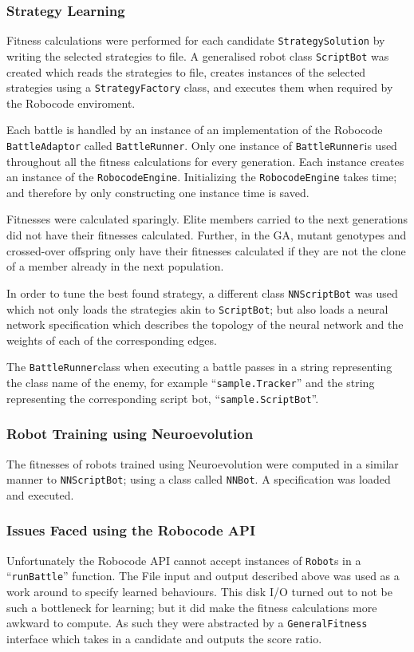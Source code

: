 \subsubsection{Strategy Learning}

Fitness calculations were performed for each candidate \texttt{StrategySolution} by writing the selected strategies to file. A generalised robot class \texttt{ScriptBot} was created which reads the strategies to file, creates instances of the selected strategies using a \texttt{StrategyFactory} class, and executes them when required by the Robocode enviroment.

\newcommand{\BattleRunner}{\texttt{BattleRunner}}

Each battle is handled by an instance of an implementation of the Robocode \\ \texttt{BattleAdaptor} called \BattleRunner. Only one instance of \BattleRunner is used throughout all the fitness calculations for every generation. Each instance creates an instance of the \texttt{RobocodeEngine}. Initializing the \texttt{RobocodeEngine} takes time; and therefore by only constructing one instance time is saved.

Fitnesses were calculated sparingly. Elite members carried to the next generations did not have their fitnesses calculated. Further, in the GA, mutant genotypes and crossed-over offspring only have their fitnesses calculated if they are not the clone of a member already in the next population.

In order to tune the best found strategy, a different class \texttt{NNScriptBot} was used which not only loads the strategies akin to \texttt{ScriptBot}; but also loads a neural network specification which describes the topology of the neural network and the weights of each of the corresponding edges.

The \BattleRunner class when executing a battle passes in a string representing the class name of the enemy, for example ``\texttt{sample.Tracker}'' and the string representing the corresponding script bot, ``\texttt{sample.ScriptBot}''.

\subsubsection{Robot Training using Neuroevolution}

The fitnesses of robots trained using Neuroevolution were computed in a similar manner to \texttt{NNScriptBot}; using a class called \texttt{NNBot}. A specification was loaded and executed. 

\subsubsection{Issues Faced using the Robocode API}
Unfortunately the Robocode API cannot accept instances of \texttt{Robot}s in a ``\texttt{runBattle}'' function. The File input and output described above was used as a work around to specify learned behaviours. This disk I/O turned out to not be such a bottleneck for learning; but it did make the fitness calculations more awkward to compute.  As such they were abstracted by a \texttt{GeneralFitness} interface which takes in a candidate and outputs the score ratio.
